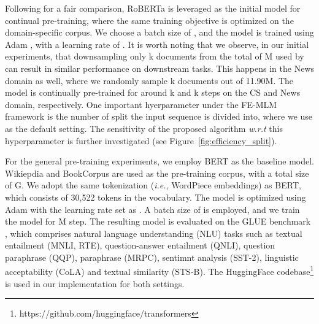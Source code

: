 \documentclass{article} \usepackage{iclr2021_conference,times}
\theoremstyle{plain}
\begin{document}
Following \citep{gururangan2020don} for a fair comparison, RoBERTa \cite{liu2019roberta} is leveraged as the initial model for continual pre-training, where the same training objective is optimized on the domain-specific corpus. We choose a batch size of , and the model is trained using Adam \cite{kingma2014adam}, with a learning rate of . It is worth noting that we observe, in our initial experiments, that downsampling only k documents from the total of M used by \cite{gururangan2020don} can result in similar performance on downstream tasks. This happens in the News domain as well, where we randomly sample k documents out of 11.90M. The model is continually pre-trained for around k and k steps on the CS and News domain, respectively. One important hyerparameter under the FE-MLM framework is the number of split the input sequence is divided into, where we use  as the default setting. The sensitivity of the proposed algorithm \emph{w.r.t} this hyperparameter is further investigated (see Figure~\ref{fig:efficiency_split}).

For the general pre-training experiments, we employ BERT as the baseline model. Wikiepdia and BookCorpus \citep{zhu2015aligning} are used as the pre-training corpus, with a total size of G. We adopt the same tokenization (\emph{i.e.}, WordPiece embeddings) as BERT, which consists of 30,522 tokens in the vocabulary. The model is optimized using Adam with the learning rate set as . A batch size of  is employed, and we train the model for M step. 
The resulting model is evaluated on the GLUE benchmark \citep{wang2018glue}, which comprises  natural language understanding (NLU) tasks such as textual entailment (MNLI, RTE), question-answer entailment (QNLI), question paraphrase (QQP), paraphrase (MRPC), sentimnt analysis (SST-2), linguistic acceptability (CoLA) and textual similarity (STS-B). The HuggingFace codebase\footnote{https://github.com/huggingface/transformers} is used in our implementation for both settings.
\end{document}
